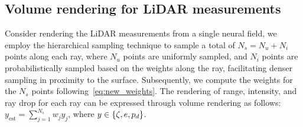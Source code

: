 \subsection{Volume rendering for LiDAR measurements}\label{sec:dynamic_nfl_rendering}
Consider rendering the LiDAR measurements from a single neural field, we employ the hierarchical sampling\cite{wang2021neus} technique to sample a total of $N_s= N_u + N_i$ points along each ray, where $N_u$ points are uniformly sampled, and $N_i$ points are probabilistically sampled based on the weights along the ray, facilitating denser sampling in proximity to the surface. Subsequently, we compute the weights for the $N_s$ points following~\cref{eq:new_weights}. The rendering of range, intensity, and ray drop for each ray can be expressed through volume rendering as follows: $y_\text{est} = \sum_{j=1}^{N_s} w_j y_j$, where $y \in \{\zeta, e, p_d\}$.




